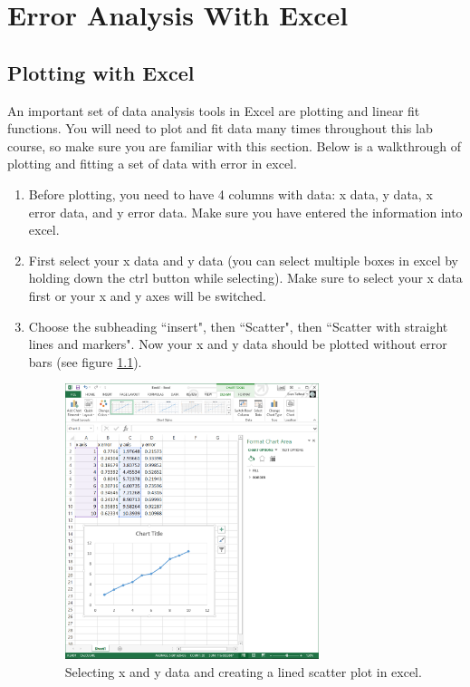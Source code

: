 \documentclass[letterpaper, 12pt]{book}
\begin{document}
\chapter{Error Analysis With Excel}

\section{Plotting with Excel}
An important set of data analysis tools in Excel are plotting and linear fit functions. You will need to plot and fit data many times throughout this lab course, so make sure you are familiar with this section. Below is a walkthrough of plotting and fitting a set of data with error in excel.
\begin{enumerate}
\item Before plotting, you need to have 4 columns with data: x data, y data, x error data, and y error data. Make sure you have entered the information into excel.
\item First select your x data and y data (you can select multiple boxes in excel by holding down the ctrl button while selecting). Make sure to select your x data first or your x and y axes will be switched.
\item Choose the subheading ``insert", then ``Scatter", then ``Scatter with straight lines and markers". Now your x and y data should be plotted without error bars (see figure \ref{fig:excel1}).

\begin{figure}[h!]
\centering
\includegraphics[height=0.4\textheight, width=0.7\textwidth]{./pic/image4.png}
\caption{Selecting x and y data and creating a lined scatter plot in excel.}
\label{fig:excel1}
\end{figure}


\end{enumerate}
\end{document}
